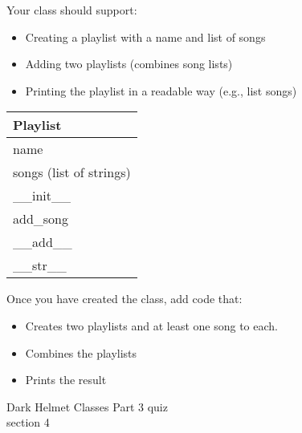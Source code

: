 \documentclass{article}
\begin{document}
\begin{enumerate}
\begin{minipage}[t]{0.65\textwidth}
			Your class should support:
			\begin{itemize}
				\item Creating a playlist with a name and list of songs
				\item Adding two playlists (combines song lists)
				\item Printing the playlist in a readable way (e.g., list songs)
			\end{itemize}	
		\end{minipage}
		\hfill
		\begin{minipage}[t]{0.32\textwidth}
			\vspace{.2em}
			\begin{flushright}
				\begin{tabular}{|l|}
					\hline
					Playlist \\ \hline
					name \\
					songs (list of strings) \\ \hline
					\_\_init\_\_ \\
					add\_song \\
					\_\_add\_\_ \\
					\_\_str\_\_ \\ \hline
				\end{tabular}
			\end{flushright}
		\end{minipage}
		
		Once you have created the class, add code that:
		\begin{itemize}
			\item Creates two playlists and at least one song to each.
			\item Combines the playlists
			\item Prints the result
		\end{itemize}



\end{enumerate}
\pagebreak
Dark Helmet \hfill Classes Part 3 quiz\\
section 4\\
\end{document}
